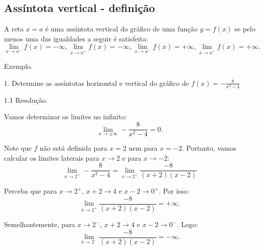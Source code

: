 \documentclass{article}
\begin{document}
{\begin{newpage}
\subsection{Assíntota vertical - definição}
\par\hspace{12pt}A reta $x=a$ é uma assíntota vertical do gráfico de uma função $y=f(x)$ se pelo menos uma das igualdades a seguir é satisfeita:
\begin{equation*} \displaystyle{\lim_{x\to a^{-}}} f(x) = -\infty , \displaystyle{\lim_{x\to a^{+}}} f(x) = -\infty , \displaystyle{\lim_{x\to a^{-}}} f(x) = +\infty , \displaystyle{\lim_{x\to a^{+}}} f(x) = +\infty . \end{equation*}
\vspace{0.3cm}
\par
Exemplo.
\par
\begin{flushleft}
1. Determine as assíntotas horizontal e vertical do gráfico de $f(x) = -\displaystyle{\frac{8}{x^2 - 4}}$
\end{flushleft}
\par
\begin{flushleft}
1.1 Resolução.
\end{flushleft}
\par Vamos determinar os limites no infinito:
\begin{equation*} \displaystyle{\lim_{x\to \pm \infty }} -\frac{8}{x^2 - 4} = 0.\end{equation*}
\par Note que $f$ não está definida para $x=2$ nem para $x=-2$. Portanto, vamos calcular os limites laterais para $x\rightarrow 2$ e para $x\rightarrow -2$:
\begin{equation*} \displaystyle{\lim_{x\to 2^{+}}} -\frac{8}{x^2 - 4} = \displaystyle{\lim_{x\to 2^{+}}} \frac{-8}{(x+2)(x-2)} \end{equation*}
\par Perceba que para $x\rightarrow 2^{+}$, $x+2\rightarrow 4$ e $x-2\rightarrow 0^{+}$. Por isso:
\begin{equation*} \displaystyle{\lim_{x\to 2^{+}}} \frac{-8}{(x+2)(x-2)} = +\infty .\end{equation*}
\par Semelhantemente, para $x\rightarrow 2^{-}$, $x+2\rightarrow 4$ e $x-2\rightarrow 0^{-}$. Logo:
\begin{equation*} \displaystyle{\lim_{x\to 2^{-}}} \frac{-8}{(x+2)(x-2)} = -\infty .\end{equation*}

\end{newpage}}
\end{document}
